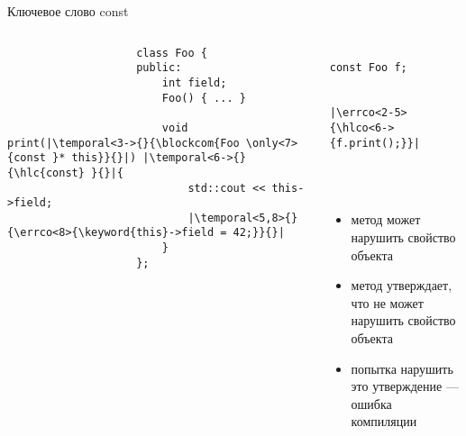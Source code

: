 \documentclass[aspectratio=169,14pt]{beamer}
\begin{document}
    \begin{frame}[fragile]{Ключевое слово const}
        \begin{columns}[T]
            \begin{column}{0.5\textwidth}
                \begin{verbatim}
                    class Foo {
                    public:
                        int field;
                        Foo() { ... }

                        void print(|\temporal<3->{}{\blockcom{Foo \only<7>{const }* this}}{}|) |\temporal<6->{}{\hlc{const} }{}|{
                            std::cout << this->field;
                            |\temporal<5,8>{}{\errco<8>{\keyword{this}->field = 42;}}{}|
                        }
                    };
                \end{verbatim}
            \end{column}
            \begin{column}{0.5\textwidth}
                \begin{verbatim}
                    const Foo f;

                    |\errco<2-5>{\hlco<6->{f.print();}}|
                \end{verbatim}
                ~\\ ~\\
                \footnotesize
                \begin{itemize}
                    \item<4-5> метод  может нарушить свойство  объекта 
                    \item<6-> метод  утверждает, что не может нарушить свойство  объекта 
                    \item<8-> попытка нарушить это утверждение --- ошибка компиляции
                \end{itemize}
            \end{column}
        \end{columns}
    \end{frame}
\end{document}
